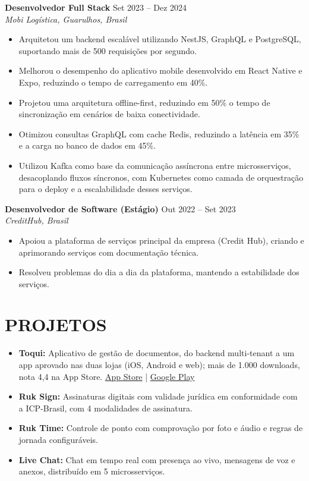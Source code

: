 \documentclass[10pt,letterpaper]{article}
\begin{document}
\textbf{Desenvolvedor Full Stack} \hfill Set 2023 -- Dez 2024 \\
\textit{Mobi Logística, Guarulhos, Brasil}
\begin{itemize}[leftmargin=*, itemsep=2pt]
    \item Arquitetou um backend escalável utilizando NestJS, GraphQL e PostgreSQL, suportando mais de 500 requisições por segundo.
    \item Melhorou o desempenho do aplicativo mobile desenvolvido em React Native e Expo, reduzindo o tempo de carregamento em 40\%.
    \item Projetou uma arquitetura offline-first, reduzindo em 50\% o tempo de sincronização em cenários de baixa conectividade.
    \item Otimizou consultas GraphQL com cache Redis, reduzindo a latência em 35\% e a carga no banco de dados em 45\%.
    \item Utilizou Kafka como base da comunicação assíncrona entre microsserviços, desacoplando fluxos síncronos, com Kubernetes como camada de orquestração para o deploy e a escalabilidade desses serviços.
\end{itemize}

\textbf{Desenvolvedor de Software (Estágio)} \hfill Out 2022 -- Set 2023 \\
\textit{CreditHub, Brasil}
\begin{itemize}[leftmargin=*, itemsep=2pt]
    \item Apoiou a plataforma de serviços principal da empresa (Credit Hub), criando e aprimorando serviços com documentação técnica.
    \item Resolveu problemas do dia a dia da plataforma, mantendo a estabilidade dos serviços.
\end{itemize}

\section{PROJETOS}
\begin{itemize}[leftmargin=*, itemsep=2pt]
    \item \textbf{Toqui:} Aplicativo de gestão de documentos, do backend multi-tenant a um app aprovado nas duas lojas (iOS, Android e web); mais de 1.000 downloads, nota 4,4 na App Store. \href{https://apps.apple.com/br/app/toqui/id6466649690}{App Store} | \href{https://play.google.com/store/apps/details?id=com.toquiapp}{Google Play}
    \item \textbf{Ruk Sign:} Assinaturas digitais com validade jurídica em conformidade com a ICP-Brasil, com 4 modalidades de assinatura.
    \item \textbf{Ruk Time:} Controle de ponto com comprovação por foto e áudio e regras de jornada configuráveis.
    \item \textbf{Live Chat:} Chat em tempo real com presença ao vivo, mensagens de voz e anexos, distribuído em 5 microsserviços.
\end{itemize}
\end{document}
